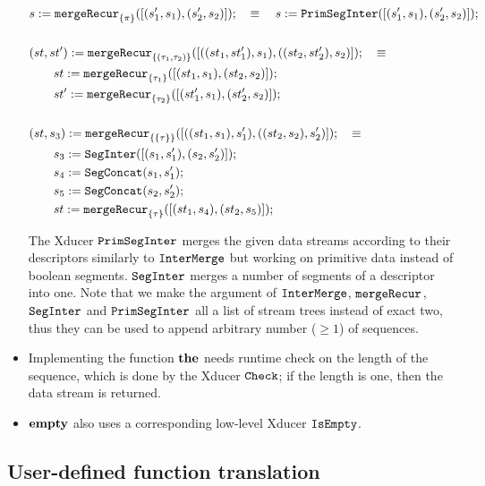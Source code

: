 \begin{itemize}
\begin{align*}
& s := \mergeRecur{\{\pi\}}([(s_1',s_1),(s_2',s_2)]); \quad \equiv  \quad s := \primseginter([(s'_1,s_1), (s_2',s_2)]); \\
\\
&(st,st')  := \mergeRecur{\{(\tau_1,\tau_2)\}}([((st_1,st_1'),s_1),((st_2,st_2'),s_2)]); \quad \equiv \\ 
& \qquad st := \mergeRecur{\{\tau_1\}}([(st_1,s_1),(st_2,s_2)]); \\ 
& \qquad st' := \mergeRecur{\{\tau_2\}}([(st_1',s_1),(st_2',s_2)]);\\
\\
& (st,s_3)  := \mergeRecur{\{\{\tau\}\}}([((st_1,s_1),s_1'),((st_2,s_2),s_2')]); \quad \equiv \\
& \qquad s_3 := \seginter([(s_1,s_1'),(s_2,s_2')]); \\ 
& \qquad s_4 := \segconcat(s_1,s_1'); \\ 
& \qquad s_5 := \segconcat(s_2,s_2'); \\ 
&\qquad st := \mergeRecur{\{\tau\}}([(st_1,s_4),(st_2,s_5)]);
\end{align*}

The Xducer $\primseginter$ merges the given data streams according to their descriptors similarly to $\intermerge$ but working on primitive data instead of boolean segments.
$\seginter$ merges a number of segments of a descriptor into one.
Note that we make the argument of $\intermerge$, $\mergeRecur{}$, $\seginter$ and $\primseginter$  all a list of stream trees instead of exact two, thus they can be used to append arbitrary number ($\ge 1$) of sequences.

\item Implementing the function $\*{the}$ needs runtime check on the length of the sequence, which is done by the Xducer $\check$; if the length is one, then the data stream is returned.


\item $\*{empty}$ also uses a corresponding low-level Xducer $\isempty$.



\end{itemize}



\subsection{User-defined function translation}

\def\sf{\mathit{sf}}

